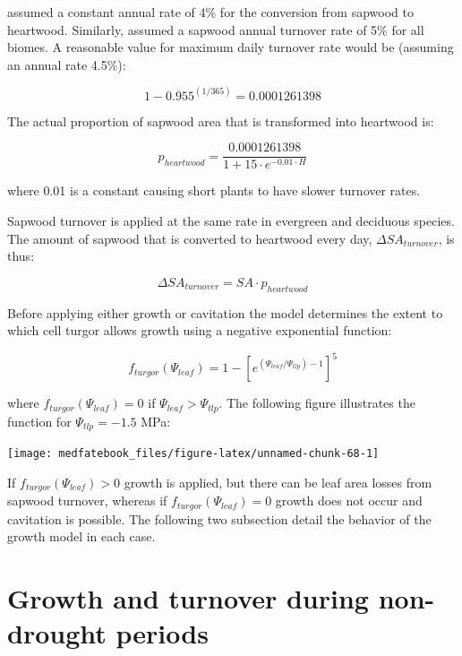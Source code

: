 \documentclass[]{book}
\begin{document}
\citet{Prentice1993} assumed a constant annual rate of 4\% for the
conversion from sapwood to heartwood. Similarly, \citet{Sitch2003}
assumed a sapwood annual turnover rate of 5\% for all biomes. A
reasonable value for maximum daily turnover rate would be (assuming an
annual rate 4.5\%):

\begin{equation}
1-0.955^{(1/365)} = 0.0001261398
\end{equation}

The actual proportion of sapwood area that is transformed into heartwood
is:

\begin{equation}
p_{heartwood} = \frac{0.0001261398}{1+15\cdot e^{-0.01\cdot H}}
\end{equation}

where 0.01 is a constant causing short plants to have slower turnover
rates.

Sapwood turnover is applied at the same rate in evergreen and deciduous
species. The amount of sapwood that is converted to heartwood every day,
\(\Delta SA_{turnover}\), is thus:

\begin{equation}
\Delta SA_{turnover} = SA \cdot p_{heartwood}
\end{equation}

Before applying either growth or cavitation the model determines the
extent to which cell turgor allows growth using a negative exponential
function:

\begin{equation}
f_{turgor}(\Psi_{leaf}) = 1 - \left[e^{(\Psi_{leaf}/\Psi_{tlp})-1}\right]^5
\end{equation}

where \(f_{turgor}(\Psi_{leaf})=0\) if \(\Psi_{leaf} > \Psi_{tlp}\). The
following figure illustrates the function for \(\Psi_{tlp}=-1.5\) MPa:

\begin{center}\texttt{[image: medfatebook\_files/figure-latex/unnamed-chunk-68-1]} \end{center}

If \(f_{turgor}(\Psi_{leaf})>0\) growth is applied, but there can be
leaf area losses from sapwood turnover, whereas if
\(f_{turgor}(\Psi_{leaf}) = 0\) growth does not occur and cavitation is
possible. The following two subsection detail the behavior of the growth
model in each case.

\section{Growth and turnover during non-drought
periods}\label{growth-and-turnover-during-non-drought-periods}
\end{document}
